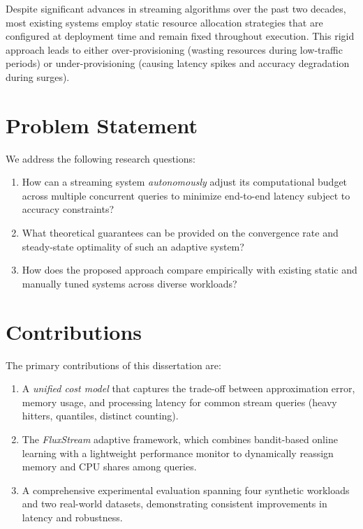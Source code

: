 \documentclass[
    language=english,
    doctype=dissertation,
    institution=none,
    titlestyle=book,
]{../../omnilatex}
\begin{document}
Despite significant advances in streaming algorithms over the past two decades, most existing systems employ static resource allocation strategies that are configured at deployment time and remain fixed throughout execution. This rigid approach leads to either over-provisioning (wasting resources during low-traffic periods) or under-provisioning (causing latency spikes and accuracy degradation during surges).

\section{Problem Statement}

We address the following research questions:

\begin{enumerate}
    \item How can a streaming system \emph{autonomously} adjust its computational budget across multiple concurrent queries to minimize end-to-end latency subject to accuracy constraints?
    \item What theoretical guarantees can be provided on the convergence rate and steady-state optimality of such an adaptive system?
    \item How does the proposed approach compare empirically with existing static and manually tuned systems across diverse workloads?
\end{enumerate}

\section{Contributions}

The primary contributions of this dissertation are:

\begin{enumerate}
    \item A \emph{unified cost model} that captures the trade-off between approximation error, memory usage, and processing latency for common stream queries (heavy hitters, quantiles, distinct counting).
    \item The \emph{FluxStream} adaptive framework, which combines bandit-based online learning with a lightweight performance monitor to dynamically reassign memory and CPU shares among queries.
    \item A comprehensive experimental evaluation spanning four synthetic workloads and two real-world datasets, demonstrating consistent improvements in latency and robustness.
\end{enumerate}
\end{document}
